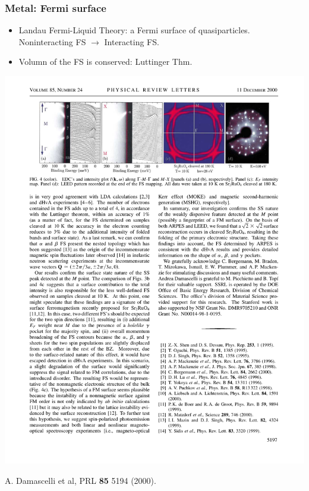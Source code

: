 \documentclass[xcolor=table, 10pt, aspectratio=1610]{beamer}
\begin{document}
\begin{frame}
  \frametitle{Metal: Fermi surface}
\begin{itemize}
  \item Landau Fermi-Liquid Theory: a Fermi surface of quasiparticles.\\
  Noninteracting FS $\rightarrow$ Interacting FS.
  \item Volumn of the FS is conserved: Luttinger Thm.
\end{itemize}
\begin{center}
	\includegraphics{../resources/SrRuO_FS}

	{\small A. Damascelli et al, PRL \textbf{85} 5194 (2000).}
\end{center}
\end{frame}
\end{document}

